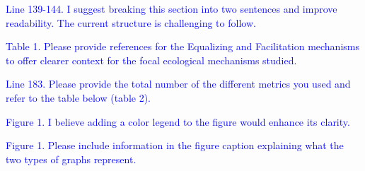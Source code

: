 \documentclass[
]{article}
\begin{document}
\textcolor{blue}{Line 139-144. I suggest breaking this section into two sentences and improve readability.
The current structure is challenging to follow.}

\textcolor{blue}{Table 1. Please provide references for the Equalizing and Facilitation mechanisms to offer clearer context for the focal ecological mechanisms studied.}

\textcolor{blue}{Line 183. Please provide the total number of the different metrics you used and refer to the table below (table 2).}

\textcolor{blue}{Figure 1. I believe adding a color legend to the figure would enhance its clarity.}

\textcolor{blue}{Figure 1. Please include information in the figure caption explaining what the two types of graphs represent.}
\end{document}
